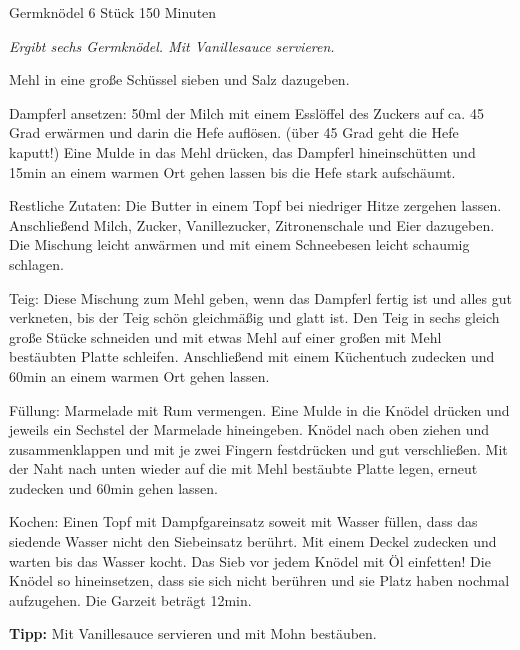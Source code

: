 \begin{recipe}{Germknödel} {6 Stück} {150 Minuten}

  \freeform
  \textit{Ergibt sechs Germknödel. Mit Vanillesauce servieren.}


  Mehl in eine große Schüssel sieben und Salz dazugeben.

  \newstep
  Dampferl ansetzen: 50ml der Milch mit einem Esslöffel des Zuckers auf ca. 45 Grad erwärmen und darin die Hefe auflösen.
  (über 45 Grad geht die Hefe kaputt!)
  Eine Mulde in das Mehl drücken, das Dampferl hineinschütten und 15min an einem warmen Ort gehen lassen bis die Hefe stark aufschäumt.

  \newstep
  Restliche Zutaten: Die Butter in einem Topf bei niedriger Hitze zergehen lassen.
  Anschließend Milch, Zucker, Vanillezucker, Zitronenschale und Eier dazugeben.
  Die Mischung leicht anwärmen und mit einem Schneebesen leicht schaumig schlagen.

  \newstep
  Teig: Diese Mischung zum Mehl geben, wenn das Dampferl fertig ist und alles gut verkneten, bis der Teig schön gleichmäßig und glatt ist.
  Den Teig in sechs gleich große Stücke schneiden und mit etwas Mehl auf einer großen mit Mehl bestäubten Platte schleifen.
  Anschließend mit einem Küchentuch zudecken und 60min an einem warmen Ort gehen lassen.

  \newstep
  Füllung: Marmelade mit Rum vermengen.
  Eine Mulde in die Knödel drücken und jeweils ein Sechstel der Marmelade hineingeben.
  Knödel nach oben ziehen und zusammenklappen und mit je zwei Fingern festdrücken und gut verschließen.
  Mit der Naht nach unten wieder auf die mit Mehl bestäubte Platte legen, erneut zudecken und 60min gehen lassen.

  \newstep
  Kochen: Einen Topf mit Dampfgareinsatz soweit mit Wasser füllen, dass das siedende Wasser nicht den Siebeinsatz berührt.
  Mit einem Deckel zudecken und warten bis das Wasser kocht.
  Das Sieb vor jedem Knödel mit Öl einfetten!
  Die Knödel so hineinsetzen, dass sie sich nicht berühren und sie Platz haben nochmal aufzugehen.
  Die Garzeit beträgt 12min.

  \freeform
  \hrulefill

  \freeform
  \textbf{Tipp:}
  Mit Vanillesauce servieren und mit Mohn bestäuben.

  \end{recipe}
